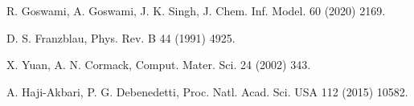 \begin{refnummer}
\item R. Goswami, A. Goswami, J. K. Singh, J. Chem. Inf. Model. 60 (2020) 2169.
\item D. S. Franzblau, Phys. Rev. B 44 (1991) 4925.
\item X. Yuan, A. N. Cormack, Comput. Mater. Sci. 24 (2002) 343.
\item A. Haji-Akbari, P. G. Debenedetti, Proc. Natl. Acad. Sci. USA 112 (2015) 10582.
\end{refnummer}
